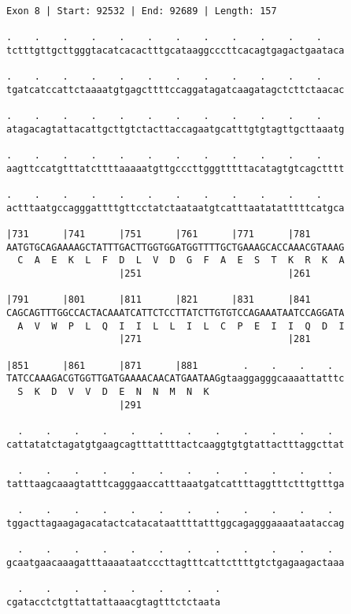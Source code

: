 \documentclass{article}
\begin{document}
\begin{Verbatim}
Exon 8 | Start: 92532 | End: 92689 | Length: 157
 
.    .    .    .    .    .    .    .    .    .    .    .    
tctttgttgcttgggtacatcacactttgcataaggcccttcacagtgagactgaataca
  
.    .    .    .    .    .    .    .    .    .    .    .    
tgatcatccattctaaaatgtgagcttttccaggatagatcaagatagctcttctaacac
  
.    .    .    .    .    .    .    .    .    .    .    .    
atagacagtattacattgcttgtctacttaccagaatgcatttgtgtagttgcttaaatg
  
.    .    .    .    .    .    .    .    .    .    .    .    
aagttccatgtttatcttttaaaaatgttgcccttgggtttttacatagtgtcagctttt
  
.    .    .    .    .    .    .    .    .    .    .    .    
actttaatgccagggattttgttcctatctaataatgtcatttaatatatttttcatgca
  
|731      |741      |751      |761      |771      |781      
AATGTGCAGAAAAGCTATTTGACTTGGTGGATGGTTTTGCTGAAAGCACCAAACGTAAAG
  C  A  E  K  L  F  D  L  V  D  G  F  A  E  S  T  K  R  K  A
                    |251                          |261      
  
|791      |801      |811      |821      |831      |841      
CAGCAGTTTGGCCACTACAAATCATTCTCCTTATCTTGTGTCCAGAAATAATCCAGGATA
  A  V  W  P  L  Q  I  I  L  L  I  L  C  P  E  I  I  Q  D  I
                    |271                          |281      
  
|851      |861      |871      |881        .    .    .    .  
TATCCAAAGACGTGGTTGATGAAAACAACATGAATAAGgtaaggagggcaaaattatttc
  S  K  D  V  V  D  E  N  N  M  N  K                        
                    |291                                    
  
  .    .    .    .    .    .    .    .    .    .    .    .  
cattatatctagatgtgaagcagtttattttactcaaggtgtgtattactttaggcttat
  
  .    .    .    .    .    .    .    .    .    .    .    .  
tatttaagcaaagtatttcagggaaccatttaaatgatcattttaggtttctttgtttga
  
  .    .    .    .    .    .    .    .    .    .    .    .  
tggacttagaagagacatactcatacataattttatttggcagagggaaaataataccag
  
  .    .    .    .    .    .    .    .    .    .    .    .  
gcaatgaacaaagatttaaaataatcccttagtttcattcttttgtctgagaagactaaa
  
  .    .    .    .    .    .    .    .
cgatacctctgttattattaaacgtagtttctctaata
\end{Verbatim}
\end{document}
